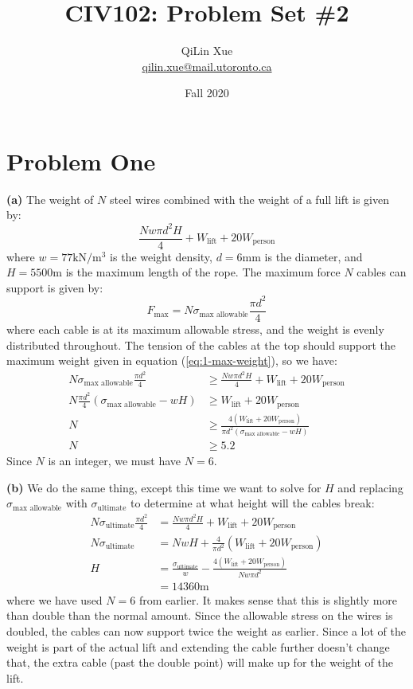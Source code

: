 \documentclass{article}
\title{CIV102: Problem Set \#2}
\author{QiLin Xue \\ \href{mailto:qilin.xue@mail.utoronto.ca}{qilin.xue@mail.utoronto.ca}}
\date{Fall 2020}
\begin{document}
\maketitle
\section{Problem One}
\textbf{(a)} The weight of $N$ steel wires combined with the weight of a full lift is given by:
\begin{equation}
    \frac{Nw\pi d^2H}{4}+W_\text{lift}+20W_\text{person}
    \label{eq:1-max-weight}
\end{equation}
where $w=77\si{\kilo\newton\per\meter\cubed}$ is the weight density, $d=6\si{\milli\meter}$ is the diameter, and $H=5500\si{\meter}$ is the maximum length of the rope. The maximum force $N$ cables can support is given by:
\begin{equation}
    F_\text{max} = N\sigma_\text{max allowable} \frac{\pi d^2}{4}
    \label{eq:}
\end{equation}
where each cable is at its maximum allowable stress, and the weight is evenly distributed throughout. The tension of the cables at the top should support the maximum weight given in equation (\ref{eq:1-max-weight}), so we have:
\begin{align}
    N\sigma_\text{max allowable} \frac{\pi d^2}{4} &\ge \frac{Nw\pi d^2H}{4}+W_\text{lift}+20W_\text{person} \\ 
    N\frac{\pi d^2}{4}\left(\sigma_\text{max allowable}-wH\right) &\ge W_\text{lift}+20W_\text{person} \\ 
    N &\ge \frac{4(W_\text{lift}+20W_\text{person})}{\pi d^2 (\sigma_\text{max allowable}-wH)} \\ 
    N &\ge 5.2
    \label{eq:}
\end{align}
Since $N$ is an integer, we must have $N=6$.

\textbf{(b)} We do the same thing, except this time we want to solve for $H$ and replacing $\sigma_\text{max allowable}$ with $\sigma_\text{ultimate}$ to determine at what height will the cables break:
\begin{align}
    N\sigma_\text{ultimate} \frac{\pi d^2}{4} &= \frac{Nw\pi d^2H}{4}+W_\text{lift}+20W_\text{person} \\ 
    N\sigma_\text{ultimate} &= NwH+\frac{4}{\pi d^2}\left(W_\text{lift}+20W_\text{person}\right) \\ 
    H &= \frac{\sigma_\text{ultimate}}{w}-\frac{4\left(W_\text{lift}+20W_\text{person}\right)}{Nw\pi d^2} \\ 
    &= 14360\si{\meter}
\end{align}
where we have used $N=6$ from earlier. It makes sense that this is slightly more than double than the normal amount. Since the allowable stress on the wires is doubled, the cables can now support twice the weight as earlier. Since a lot of the weight is part of the actual lift and extending the cable further doesn't change that, the extra cable (past the double point) will make up for the weight of the lift.
\end{document}
